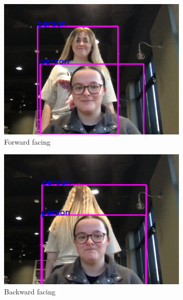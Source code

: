 \documentclass[12pt]{article}
\theoremstyle{plain}
\theoremstyle{definition}
\begin{document}
\begin{figure}
     \centering
     \begin{subfigure}[b]{0.3\textwidth}
         \centering
         \includegraphics[width=\textwidth]{img/fig1-img1.png}
         \caption{Forward facing}
         \label{fig:a}
     \end{subfigure}
     \hfill
     \begin{subfigure}[b]{0.3\textwidth}
         \centering
         \includegraphics[width=\textwidth]{img/fig1-img2.png}
         \caption{Backward facing}
         \label{fig:b}
     \end{subfigure}
     \hfill
     \begin{subfigure}[b]{0.3\textwidth}
         \centering

\end{subfigure}
\end{figure}
\end{document}
